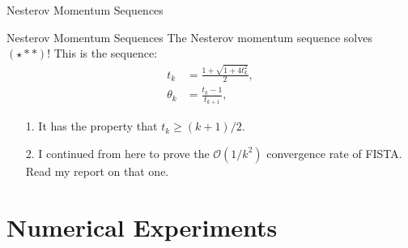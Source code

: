 \documentclass[11pt]{beamer}
\begin{document}
        \begin{frame}{Nesterov Momentum Sequences}
            \begin{block}{Nesterov Momentum Sequences}
                The Nesterov momentum sequence solves $(\star**)$! This is the sequence:
            \begin{align*}
                t_k &= \frac{1 + \sqrt{1 + 4t_k^2}}{2}, 
                \\
                \theta_k &= \frac{t_k - 1}{t_{k + 1}}, 
                \tag{$\star \star *$}
            \end{align*}
            \end{block}
            \begin{itemize}
                \item [1.] It has the property that $t_k \ge (k + 1)/2$. 
                \item [2.] I continued from here to prove the $\mathcal O(1/k^2)$ convergence rate of FISTA. Read my report on that one. 
            \end{itemize}
        \end{frame}
\section{Numerical Experiments}
\end{document}
